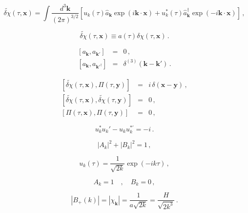 \begin{equation}
\widetilde{\delta \chi} (\tau , \mathbf{x}) = \int \frac{d^3 \mathbf{k}}{(2\pi)^{3/2}} \left[ u_{k} (\tau) \hat{a}_{\mathbf{k}} \exp(i \mathbf{k} \cdot \mathbf{x} ) + u_{k}^{\ast}(\tau) \hat{a}_{\mathbf{k}}^{\dagger} \exp(-i \mathbf{k} \cdot \mathbf{x} )    \right]\, ,
\label{equation:3.2.17}
\end{equation}
 

\begin{equation}
\widetilde{\delta \chi} (\tau,\mathbf{x}) \equiv a(\tau) \delta \chi (\tau,\mathbf{x})\, .
\label{equation:3.2.18}
\end{equation} 

\begin{eqnarray}
\left[ a_{\mathbf{k}} , a_{\mathbf{k'}} \right] & = & 0 \, , \nonumber \\
\left[ a_{\mathbf{k}} , a_{\mathbf{k'}^{\dagger}} \right] & = & \delta^{(3)}(\mathbf{k}-\mathbf{k'}) \, . 
\label{equation:3.2.19}
\end{eqnarray}

\begin{eqnarray}
\left[ \widetilde{\delta \chi}(\tau,\mathbf{x}),\Pi (\tau,\mathbf{y}) \right] & = & i\, \delta (\mathbf{x} - \mathbf{y}) \, , \nonumber \\  \left[ \widetilde{\delta \chi}(\tau,\mathbf{x}),\widetilde{\delta \chi}(\tau,\mathbf{y}) \right] & = & 0 \, , \nonumber \\ \left[  \Pi(\tau,\mathbf{x}),\Pi (\tau,\mathbf{y}) \right] & = & 0 \, ,
\label{equation:3.2.20} 
\end{eqnarray}  

\begin{equation}
u_k^{\ast} u_k' - u_k u_k^{\ast '} = -i \, .
\label{equation:3.2.21}
\end{equation}

\begin{equation}
| A_k |^2 + | B_k |^2 = 1\, ,
\label{equation:3.2.22}
\end{equation}

\begin{equation}
u_k(\tau) = \frac{1}{\sqrt{2k}} \exp(-ik\tau) \, ,
\label{equation:3.2.23}  
\end{equation}


\begin{equation}
A_k = 1 \quad , \quad B_k =0 \, ,
\label{equation:3.2.24}
\end{equation} 


\begin{equation}
| B_+ (k) | = | \chi_{\mathbf{k}} | = \frac{1}{a\sqrt{2k}} = \frac{H}{\sqrt{2k^3}}\, .
\label{equation:3.2.25}
\end{equation}

